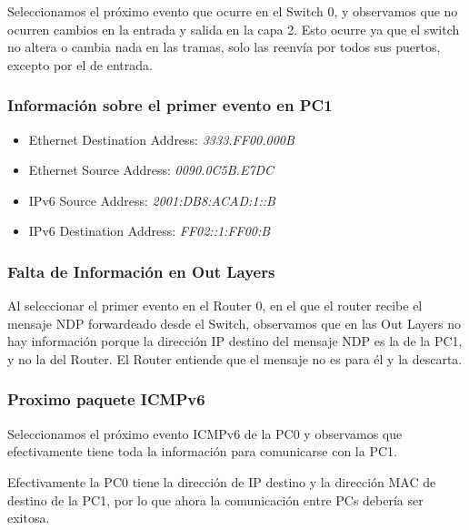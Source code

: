 \documentclass[a4paper,12pt]{article}
\begin{document}
Seleccionamos el próximo evento que ocurre en el Switch 0, y observamos que no ocurren cambios en la entrada y salida en la capa 2. Esto ocurre ya que el switch no altera o cambia nada en las tramas, solo las reenvía por todos sus puertos, excepto por el de entrada.

\bigskip

\subsubsection{Información sobre el primer evento en PC1}

\begin{itemize}
    \item Ethernet Destination Address: \textit{3333.FF00.000B}
    \item Ethernet Source Address: \textit{0090.0C5B.E7DC}
    \item IPv6 Source Address: \textit{2001:DB8:ACAD:1::B}
    \item IPv6 Destination Address: \textit{FF02::1:FF00:B}
\end{itemize}

\bigskip

\subsubsection{Falta de Información en Out Layers}

Al seleccionar el primer evento en el Router 0, en el que el router recibe el mensaje NDP forwardeado desde el Switch, observamos que en las Out Layers no hay información porque la dirección IP destino del mensaje NDP es la de la PC1, y no la del Router. El Router entiende que el mensaje no es para él y la descarta.

\bigskip

\subsubsection{Proximo paquete ICMPv6}

Seleccionamos el próximo evento ICMPv6 de la PC0 y observamos que efectivamente tiene toda la información para comunicarse con la PC1.

\bigskip


Efectivamente la PC0 tiene la dirección de IP destino y la dirección MAC de destino de la PC1, por lo que ahora la comunicación entre PCs debería ser exitosa.
\end{document}
